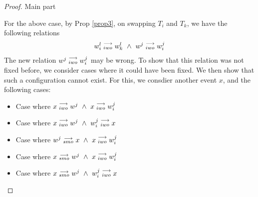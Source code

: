 \begin{proof}{Main part}
\begin{itemize}
                        For the above case, by Prop \ref{prop3}, on swapping $T_i$ and $T_k$, we have the following relations 
                        \begin{align*}
                            \reln{w_i^l}{iwo}{w_k^l} \ \wedge \ \reln{w^j}{iwo}{w_i^j}
                        \end{align*}
                        The new relation $w^j\stackrel{\longrightarrow}{_{iwo}}w_i^j$ may be wrong. 
                        To show that this relation was not fixed before, we consider cases where it could have been fixed. We then show that such a configuration cannot exist. For this, we consdier another event $x$, and the following cases:
                        \begin{itemize}
                            \item Case where $x\stackrel{\longrightarrow}{_{iwo}}w^j \ \wedge \ x\stackrel{\longrightarrow}{_{iwo}}w_i^j$
                            \item Case where $x\stackrel{\longrightarrow}{_{iwo}}w^j \ \wedge \ w_i^j\stackrel{\longrightarrow}{_{iwo}}x$
                            \item Case where $w^j\stackrel{\longrightarrow}{_{smo}}x \ \wedge \ x\stackrel{\longrightarrow}{_{iwo}}w_i^j$
                            \item Case where $x\stackrel{\longrightarrow}{_{smo}}w^j \ \wedge \ x\stackrel{\longrightarrow}{_{iwo}}w_i^j$
                            \item Case where $x\stackrel{\longrightarrow}{_{smo}}w^j \ \wedge \ w_i^j\stackrel{\longrightarrow}{_{iwo}}x$

\end{itemize}
\end{itemize}
\end{proof}
